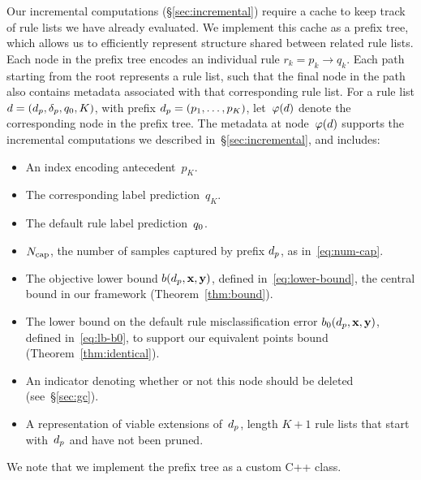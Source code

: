 Our incremental computations (\S\ref{sec:incremental}) require a
cache to keep track of rule lists we have already evaluated.
%
We implement this cache as a prefix tree, which allows us to efficiently
represent structure shared between related rule lists.
%
Each node in the prefix tree encodes an individual rule ${r_k = p_k \rightarrow q_k}$.
%
Each path starting from the root represents a rule list, such that the final node
in the path also contains metadata associated with that corresponding rule list.
%
For a rule list ${{d} = (d_p, \delta_p, q_0, K)}$,
with prefix ${d_p = (p_1, \dots, p_K)}$,
let~$\varphi({d})$ denote the corresponding node in the prefix tree.
%
The metadata at node~$\varphi({d})$ supports the incremental computations
we described in~\S\ref{sec:incremental}, and includes:
\begin{itemize}
\item An index encoding antecedent~$p_K$.
\item The corresponding label prediction~$q_K$.
\item The default rule label prediction~$q_0$.
\item $N_{\textnormal{cap}}$, the number of samples captured by prefix $d_p$, as in~\eqref{eq:num-cap}. %
\item The objective lower bound $b(d_p, \mathbf{x}, \mathbf{y})$, defined in~\eqref{eq:lower-bound},
  the central bound in our framework (Theorem~\ref{thm:bound}).
\item The lower bound on the default rule misclassification error
  $b_0(d_p, \mathbf{x}, \mathbf{y})$, defined in~\eqref{eq:lb-b0},
  to support our equivalent points bound (Theorem~\ref{thm:identical}).
\item An indicator denoting whether or not this node should be deleted (see~\S\ref{sec:gc}).
\item A representation of viable extensions of~$d_p$,
  \ie length ${K+1}$ rule lists that start with~$d_p$ and have not been pruned.
\end{itemize}
We note that we implement the prefix tree as a custom C++ class. %
%
%

